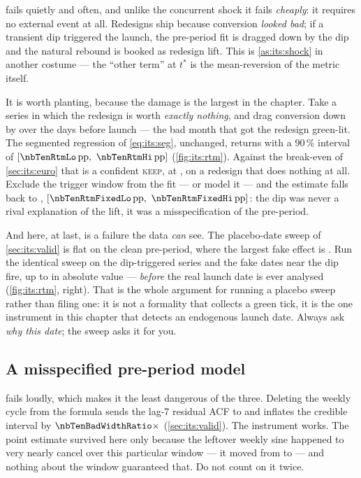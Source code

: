  fails quietly and often, and unlike the concurrent shock it fails
\emph{cheaply}: it requires no external event at all. Redesigns ship because conversion
\emph{looked bad}; if a transient dip triggered the launch, the pre-period fit is dragged down by
the dip and the natural rebound is booked as redesign lift. This is \cref{as:its:shock} in another
costume --- the ``other term'' at $t^{*}$ is the mean-reversion of the metric itself.

It is worth planting, because the damage is the largest in the chapter. Take a series in which the
redesign is worth \emph{exactly nothing}, and drag conversion down by \pp{\nbTenRtmDip} over the
\nbTenRtmDipLen{} days before launch --- the bad month that got the redesign green-lit. The
segmented regression of \cref{eq:its:seg}, unchanged, returns \pp{\nbTenRtmEst} with a 90\,\%
interval of $[\pp{\nbTenRtmLo},\ \pp{\nbTenRtmHi}]$ (\cref{fig:its:rtm}). Against the
\pp{\nbTenBeLift} break-even of \cref{sec:its:euro} that is a confident \textsc{keep}, at
\eur{\nbTenCost}, on a redesign that does nothing at all. Exclude the trigger window from the fit
--- or model it --- and the estimate falls back to \pp{\nbTenRtmFixed},
$[\pp{\nbTenRtmFixedLo},\ \pp{\nbTenRtmFixedHi}]$: the dip was never a rival explanation of the
lift, it was a misspecification of the pre-period.

And here, at last, is a failure the data \emph{can} see. The placebo-date sweep of
\cref{sec:its:valid} is flat on the clean pre-period, where the largest fake effect is
\pp{\nbTenRtmCleanPlaceboMax}. Run the identical sweep on the dip-triggered series and the fake
dates near the dip fire, up to \pp{\nbTenRtmPlaceboMax} in absolute value --- \emph{before} the
real launch date is ever analysed (\cref{fig:its:rtm}, right). That is the whole argument for
running a placebo sweep rather than filing one: it is not a formality that collects a green tick,
it is the one instrument in this chapter that detects an endogenous launch date. Always ask
\emph{why this date}; the sweep asks it for you.



\subsection*{A misspecified pre-period model}

 fails loudly, which makes it the least dangerous of the three. Deleting the
weekly cycle from the formula sends the lag-7 residual ACF to \nbTenAcfBadSeven{} and inflates the
credible interval by $\nbTenBadWidthRatio\times$ (\cref{sec:its:valid}). The instrument works. The
point estimate survived here only because the leftover weekly sine happened to very nearly cancel
over this particular window --- it moved from \pp{\nbTenBayesAvg} to \pp{\nbTenBadAvg} --- and
nothing about the window guaranteed that. Do not count on it twice.

